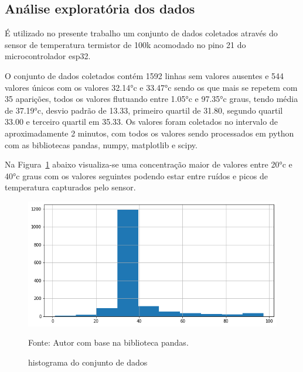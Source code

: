 



\subsection{Análise exploratória dos dados}
É utilizado no presente trabalho um conjunto de dados coletados através do sensor de temperatura termistor de 100k acomodado no pino 21 do microcontrolador esp32. 

O conjunto de dados coletados contém 1592 linhas sem valores ausentes e 544 valores únicos com os valores \ang{32.14}c e \ang{33.47}c sendo os que mais se repetem com 35 aparições, todos os valores flutuando entre \ang{1.05}c e \ang{97.35}c graus, tendo média de \ang{37.19}c, desvio padrão de 13.33, primeiro quartil de 31.80, segundo quartil 33.00 e terceiro quartil em 35.33.
Os valores foram coletados no intervalo de aproximadamente 2 minutos, com todos os valores sendo processados em python com as bibliotecas pandas, numpy, matplotlib e scipy.


Na Figura~\ref{fig: hist} abaixo visualiza-se uma concentração maior de valores entre \ang{20}c e \ang{40}c graus com os valores seguintes podendo estar entre ruídos e picos de temperatura capturados pelo sensor. 

\begin{figure}[H]
	\centering
	\includegraphics[width=15cm]{imagens/sensores/hist.png}
	\caption{histograma do conjunto de dados}
	Fonte: Autor com base na biblioteca pandas.
	\label{fig: hist}
\end{figure}

